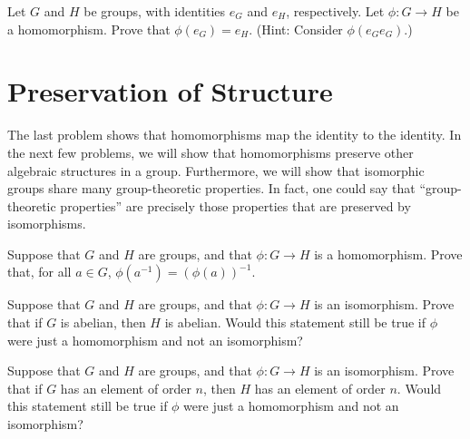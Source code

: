 \begin{problem}
Let \(G\) and \(H\) be groups, with identities \(e_G\) and \(e_H\), respectively. Let \(\phi : G \longrightarrow H\) be a homomorphism. Prove that \(\phi(e_G) = e_H\). (Hint: Consider \(\phi(e_Ge_G)\).)
\end{problem}

\section{Preservation of Structure}

The last problem shows that homomorphisms map the identity to the identity. In the next few problems, we will show that homomorphisms preserve other algebraic structures in a group. Furthermore, we will show that isomorphic groups share many group-theoretic properties. In fact, one could say that ``group-theoretic properties'' are precisely those properties that are preserved by isomorphisms.

\begin{problem}
Suppose that \(G\) and \(H\) are groups, and that \(\phi : G \longrightarrow H \) is a homomorphism. Prove that, for all \( a \in G\), \(\phi(a^{-1}) = (\phi(a))^{-1} \).
\end{problem}

\begin{problem}
Suppose that \(G\) and \(H\) are groups, and that \(\phi : G \longrightarrow H \) is an isomorphism. Prove that if \(G\) is abelian, then \(H\) is abelian. Would this statement still be true if \(\phi\) were just a homomorphism and not an isomorphism?
\end{problem}

\begin{problem}
Suppose that \(G\) and \(H\) are groups, and that \(\phi : G \longrightarrow H \) is an isomorphism. Prove that if \(G\) has an element of order \(n\), then \(H\) has an element of order \(n\). Would this statement still be true if \(\phi\) were just a homomorphism and not an isomorphism?
\end{problem}

